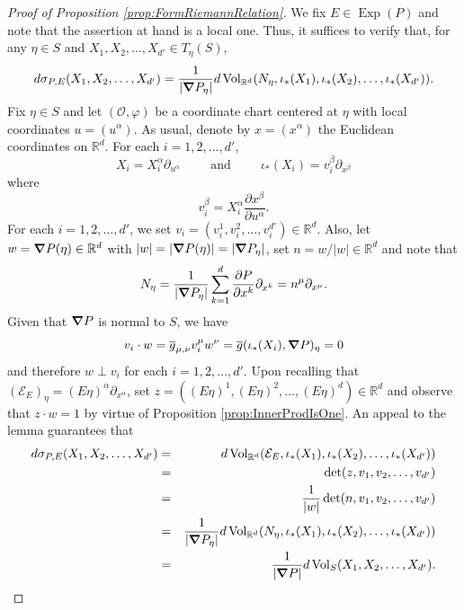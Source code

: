 \documentclass[11pt]{article}
\theoremstyle{remark}
\newcommand\Exp{\operatorname{Exp}}
\renewcommand\det{\operatorname{det}}
\newcommand{\Vol}{\operatorname{Vol}}
\begin{document}
\begin{proof}[Proof of Proposition \ref{prop:FormRiemannRelation}]
We fix $E\in\Exp(P)$ and note that the assertion at hand is a local one. Thus, it suffices to verify that, for any $\eta\in S$ and $X_1,X_2,\dots,X_{d'}\in T_\eta(S)$, 
\begin{equation*}
    d\sigma_{P,E}(X_1,X_2,\dots,X_{d'})=\frac{1}{|\grad P_{\eta}|}d\Vol_{\mathbb{R}^d}(N_\eta,\iota_*(X_1),\iota_*(X_2),\dots,\iota_*(X_{d'})).
\end{equation*}
Fix $\eta\in S$ and let $(\mathcal{O},\varphi)$ be a coordinate chart centered at $\eta$ with local coordinates $u=(u^{\alpha})$. As usual, denote by $x=(x^{\alpha})$ the Euclidean coordinates on $\mathbb{R}^d$.  For each $i=1,2,\dots,{d'}$, \begin{equation*}
X_i=X_i^\alpha \partial_{u^{\alpha}}\hspace{1cm}\mbox{and}\hspace{1cm}\iota_*(X_i)=v_i^\beta\partial_{x^{\beta}}
\end{equation*}
where
\begin{equation*}
v_i^\beta =X_i^\alpha\frac{\partial x^\beta}{\partial u^\alpha}.
\end{equation*}
For each $i=1,2,\dots,d'$, we set $v_i=(v_i^1,v_i^2,\dots,v_i^{d'})\in\mathbb{R}^d$. Also, let $w=\grad P(\eta)\in\mathbb{R}^d$ with $|w|=|\grad P(\eta)|=|\grad P_\eta|$, set $n=w/|w|\in\mathbb{R}^d$ and note that
\begin{equation*}
    N_\eta=\frac{1}{|\grad P_\eta|}\sum_{k=1}^d\frac{\partial P}{\partial x^{k}}\partial_{x^k}=n^{\mu}\partial_{x^\mu}.
\end{equation*}Given that $\grad P$ is normal to $S$, we have
\begin{equation*}
    v_i\cdot w=\overline{g}_{\mu,\nu}v_i^\mu w^\nu= \overline{g}(\iota_*(X_i),\grad P)_\eta=0
\end{equation*}
and therefore $w\perp v_i$ for each $i=1,2,\dots,{d'}$. Upon recalling that $(\mathcal{E}_E)_\eta=(E\eta)^\alpha\partial_{x^{\alpha}}$, set $z=((E\eta)^1,(E\eta)^2,\dots,(E\eta)^d)\in\mathbb{R}^d$ and observe that $z\cdot w=1$ by virtue of Proposition \ref{prop:InnerProdIsOne}. An appeal to the lemma guarantees that
\begin{eqnarray*}
d\sigma_{P,E}(X_1,X_2,\dots,X_{d'})&=&d\Vol_{\mathbb{R}^d}(\mathcal{E}_E,\iota_*(X_1),\iota_*(X_2),\dots,\iota_*(X_{d'}))\\
&=&\det(z,v_1,v_2,\dots,v_{d'})\\
&=&\frac{1}{|w|}\det(n,v_1,v_2,\dots,v_{d'})\\
&=&\frac{1}{|\grad P_\eta|}d\Vol_{\mathbb{R}^d}(N_\eta,\iota_*(X_1),\iota_*(X_2),\dots,\iota_*(X_{d'}))\\
&=&\frac{1}{|\grad P|}d\Vol_S(X_1,X_2,\dots,X_{d'}).
\end{eqnarray*}
\end{proof}
\end{document}
